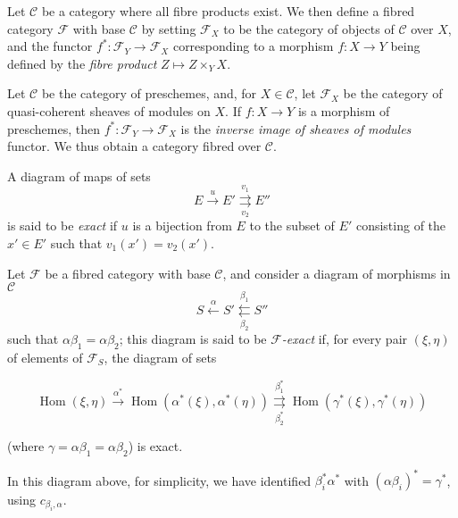 \begin{example}\label{fga3.i-a.1-example-1}
    Let $\mathcal{C}$ be a category where all fibre products exist.
    We then define a fibred category $\mathcal{F}$ with base $\mathcal{C}$ by setting $\mathcal{F}_X$ to be the category of objects of $\mathcal{C}$ over $X$, and the functor $f^*\colon\mathcal{F}_Y\to\mathcal{F}_X$ corresponding to a morphism $f\colon X\to Y$ being defined by the \emph{fibre product} $Z\mapsto Z\times_Y X$.
\end{example}

\begin{example}\label{fga3.i-a.1-example-2}
    Let $\mathcal{C}$ be the category of preschemes, and, for $X\in\mathcal{C}$, let $\mathcal{F}_X$ be the category of quasi-coherent sheaves of modules on $X$.
    If $f\colon X\to Y$ is a morphism of preschemes, then $f^*\colon\mathcal{F}_Y\to\mathcal{F}_X$ is the \emph{inverse image of sheaves of modules} functor.
    We thus obtain a category fibred over $\mathcal{C}$.
\end{example}

\label{fga3.i-a.1.b}
\begin{definition}\label{fga3.i-a.1-definition-1.2}
    A diagram of maps of sets
    \[
        E \xrightarrow{u}
        E' \overset{v_1}{\underset{v_2}{\rightrightarrows}}
        E''
    \]
    is said to be \emph{exact} if $u$ is a bijection from $E$ to the subset of $E'$ consisting of the $x'\in E'$ such that $v_1(x')=v_2(x')$.
\end{definition}

\begin{definition}\label{fga3.i-a.1-definition-1.3}
    Let $\mathcal{F}$ be a fibred category with base $\mathcal{C}$, and consider a diagram of morphisms in $\mathcal{C}$
    \[
        S \xleftarrow{\alpha}
        S' \overset{\beta_1}{\underset{\beta_2}{\leftleftarrows}}
        S''
    \]
    such that $\alpha\beta_1=\alpha\beta_2$;
    this diagram is said to be \emph{$\mathcal{F}$-exact} if, for every pair $(\xi,\eta)$ of elements of $\mathcal{F}_S$, the diagram of sets

    \begin{equation}\tag{+}\label{fga3.i-a.1-definition-1.3-equation}
        \operatorname{Hom}(\xi,\eta) \xrightarrow{\alpha^*}
        \operatorname{Hom}(\alpha^*(\xi),\alpha^*(\eta)) \overset{\beta_1^*}{\underset{\beta_2^*}{\rightrightarrows}}
        \operatorname{Hom}(\gamma^*(\xi),\gamma^*(\eta))
    \end{equation}

    (where $\gamma=\alpha\beta_1=\alpha\beta_2$) is exact.

    In this diagram above, for simplicity, we have identified $\beta_i^*\alpha^*$ with $(\alpha\beta_i)^*=\gamma^*$, using $c_{\beta_i,\alpha}$.
\end{definition}


